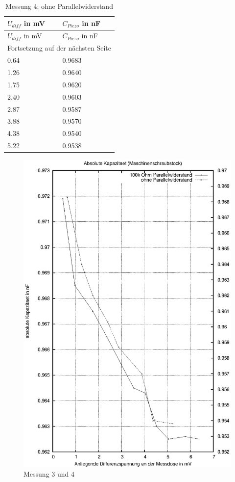 \documentclass[12pt]{scrreprt} %
\begin{document}
\setlongtables
\begin{longtable}{| l | l |}
\caption{Messung 4; ohne Parallelwiderstand}\\
\hline
$U_{diff}$ in mV&$C_{Piezo}$ in nF\\
\hline
\endfirsthead
\hline
$U_{diff}$ in mV&$C_{Piezo}$ in nF\\
\hline
\endhead
\hline
\multicolumn{2}{|c|}{Fortsetzung auf der nächsten Seite}\\
\hline
\endfoot
\hline \hline
\endlastfoot
\hline
\label{tab:2.4}%
0.64&0.9683\\
1.26&0.9640\\
1.75&0.9620\\
2.40&0.9603\\
2.87&0.9587\\
3.88&0.9570\\
4.38&0.9540\\
5.22&0.9538\\
\end{longtable}

\begin {figure}[htbp]
      \begin{center}
        \includegraphics{tabelle2_1_3}
      \end{center}
\caption{Messung 3 und 4}
\label{fig:2.3}
\end{figure}
\newpage
\end{document}
